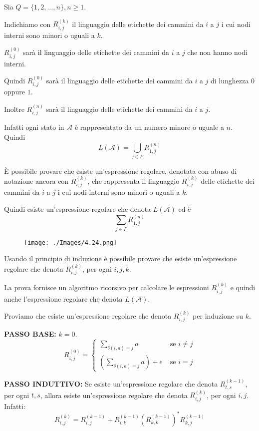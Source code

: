 Sia $Q=\{1,2, \ldots, n\}, n \geq 1$.

Indichiamo con $R_{i, j}^{(k)}$ il linguaggio delle etichette dei cammini da $i$ a $j$ i cui nodi interni sono minori o uguali a $k$.

$R_{i, j}^{(0)}$ sarà il linguaggio delle etichette dei cammini da $i$ a $j$ che non hanno nodi interni.

Quindi $R_{i, j}^{(0)}$ sarà il linguaggio delle etichette dei cammini da $i$ a $j$ di lunghezza 0 oppure $1 .$

\vspace{5mm}

Inoltre $R_{i, j}^{(n)}$ sarà il linguaggio delle etichette dei cammini da $i$ a $j$.

Infatti ogni stato in $\mathcal{A}$ è rappresentato da un numero minore o uguale a $n$.
Quindi
$$
L(\mathcal{A})=\bigcup_{j \in F} R_{1, j}^{(n)}
$$

È possibile provare che esiste un'espressione regolare, denotata con abuso di notazione ancora con $R_{i, j}^{(k)}$, che rappresenta il linguaggio $R_{i, j}^{(k)}$ delle etichette dei cammini da $i$ a $j$ i cui nodi interni sono minori o uguali a $k$.

Quindi esiste un'espressione regolare che denota $L(\mathcal{A})$ ed è
$$
\sum_{j \in F} R_{1, j}^{(n)}
$$

\begin{figure}[hbpt!]
    \centering
    \texttt{[image: ./Images/4.24.png]}
\end{figure}
\FloatBarrier

Usando il principio di induzione è possibile provare che esiste un'espressione regolare che denota $R_{i, j}^{(k)}$, per ogni $i, j, k$.

La prova fornisce un algoritmo ricorsivo per calcolare le espressioni $R_{i, j}^{(k)}$ e quindi anche l'espressione regolare che denota $L(\mathcal{A})$.

\vspace{5mm}

Proviamo che esiste un'espressione regolare che denota $R_{i, j}^{(k)}$ per induzione su $k$.

\textbf{PASSO BASE:} $k=0 .$
$$
R_{i, j}^{(0)}= \begin{cases}\sum_{\delta(i, a)=j} a & \text { se } i \neq j \\ \left(\sum_{\delta(i, a)=j} a\right)+\epsilon & \text { se } i=j\end{cases}
$$


\textbf{PASSO INDUTTIVO:} Se esiste un'espressione regolare che denota $R_{t, s}^{(k-1)}$, per ogni $t, s$, allora esiste un'espressione regolare che denota $R_{i, j}^{(k)}$, per ogni $i, j$. Infatti:
$$
R_{i, j}^{(k)}=R_{i, j}^{(k-1)}+R_{i, k}^{(k-1)}\left(R_{k, k}^{(k-1)}\right)^{*} R_{k, j}^{(k-1)}
$$

